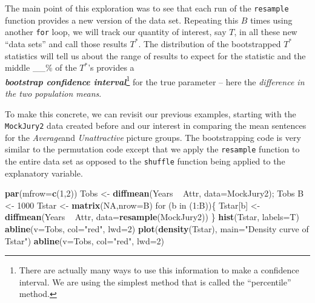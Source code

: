 \documentclass[]{book}
\newenvironment{Shaded}{\begin{snugshade}}{\end{snugshade}}
\newcommand{\KeywordTok}[1]{\textcolor[rgb]{0.13,0.29,0.53}{\textbf{{#1}}}}
\newcommand{\DataTypeTok}[1]{\textcolor[rgb]{0.13,0.29,0.53}{{#1}}}
\newcommand{\DecValTok}[1]{\textcolor[rgb]{0.00,0.00,0.81}{{#1}}}
\newcommand{\StringTok}[1]{\textcolor[rgb]{0.31,0.60,0.02}{{#1}}}
\newcommand{\OtherTok}[1]{\textcolor[rgb]{0.56,0.35,0.01}{{#1}}}
\newcommand{\NormalTok}[1]{{#1}}
\let\rmarkdownfootnote\footnote%
\def\footnote{\protect\rmarkdownfootnote}
\begin{document}
The main point of this exploration was to see that each run of the
\texttt{resample} function provides a new version of the data set.
Repeating this \(B\) times using another \texttt{for} loop, we will
track our quantity of interest, say \(T\), in all these new ``data
sets'' and call those results \(T^*\). The distribution of the
bootstrapped \(T^*\) statistics will tell us about the range of results
to expect for the statistic and the middle \_\_\% of the \(T^*\)'s
provides a\\
\textbf{\emph{bootstrap confidence interval}}\footnote{There are
  actually many ways to use this information to make a confidence
  interval. We are using the simplest method that is called the
  ``percentile'' method.} for the true parameter -- here the
\emph{difference in the two population means}.

To make this concrete, we can revisit our previous examples, starting
with the \texttt{MockJury2} data created before and our interest in
comparing the mean sentences for the \emph{Average}and
\emph{Unattractive} picture groups. The bootstrapping code is very
similar to the permutation code except that we apply the
\texttt{resample} function to the entire data set as opposed to the
\texttt{shuffle} function being applied to the explanatory variable.





\begin{Shaded}
\begin{Highlighting}[]
\KeywordTok{par}\NormalTok{(}\DataTypeTok{mfrow=}\KeywordTok{c}\NormalTok{(}\DecValTok{1}\NormalTok{,}\DecValTok{2}\NormalTok{))}
\NormalTok{Tobs <-}\StringTok{ }\KeywordTok{diffmean}\NormalTok{(Years ~}\StringTok{ }\NormalTok{Attr, }\DataTypeTok{data=}\NormalTok{MockJury2); Tobs}
\NormalTok{B <-}\StringTok{ }\DecValTok{1000}
\NormalTok{Tstar <-}\StringTok{ }\KeywordTok{matrix}\NormalTok{(}\OtherTok{NA}\NormalTok{,}\DataTypeTok{nrow=}\NormalTok{B)}
\NormalTok{for (b in (}\DecValTok{1}\NormalTok{:B))\{}
  \NormalTok{Tstar[b] <-}\StringTok{ }\KeywordTok{diffmean}\NormalTok{(Years ~}\StringTok{ }\NormalTok{Attr, }\DataTypeTok{data=}\KeywordTok{resample}\NormalTok{(MockJury2))}
  \NormalTok{\}}
\KeywordTok{hist}\NormalTok{(Tstar, }\DataTypeTok{labels=}\NormalTok{T)}
\KeywordTok{abline}\NormalTok{(}\DataTypeTok{v=}\NormalTok{Tobs, }\DataTypeTok{col=}\StringTok{"red"}\NormalTok{, }\DataTypeTok{lwd=}\DecValTok{2}\NormalTok{)}
\KeywordTok{plot}\NormalTok{(}\KeywordTok{density}\NormalTok{(Tstar), }\DataTypeTok{main=}\StringTok{"Density curve of Tstar"}\NormalTok{)}
\KeywordTok{abline}\NormalTok{(}\DataTypeTok{v=}\NormalTok{Tobs, }\DataTypeTok{col=}\StringTok{"red"}\NormalTok{, }\DataTypeTok{lwd=}\DecValTok{2}\NormalTok{)}
\end{Highlighting}
\end{Shaded}
\end{document}
